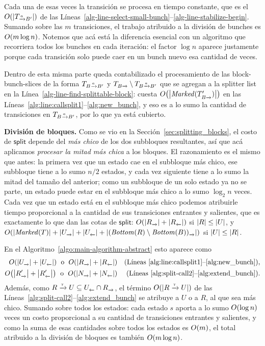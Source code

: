 Cada una de esas veces la transición se procesa en tiempo constante, que es el $\bigo{\size{\TaB}}$ de las Líneas~\ref{alg-line-select-small-bunch}--\ref{alg-line-stabilize-begin}. Sumando sobre las $m$ transiciones, el trabajo atribuido a la división de bunches es ${O\!\left(m \log n\right)}$. Notemos que acá está la diferencia esencial con un algoritmo que recorriera todos los bunches en cada iteración: el factor $\log n$ aparece justamente porque cada transición solo puede caer en un bunch nuevo esa cantidad de veces.

Dentro de esta misma parte queda contabilizado el procesamiento de las block-bunch-slices de la forma $\TBaB$ y $\TB \setminus \TBaB$ que se agregan a la splitter list en la Línea~\ref{alg-line-find-splittable-block}: cuesta $\bigo{\size{\Marked(\TB')}}$ en las Líneas~\ref{alg:line:callsplit1}--\ref{alg:new_bunch}, y eso es a lo sumo la cantidad de transiciones en $\TBaB$, por lo que ya está cubierto.

\textbf{División de bloques.} Como se vio en la Sección~\ref{sec:splitting_blocks}, el costo de $\mathsf{split}$ depende del \emph{más chico} de los dos subbloques resultantes, así que acá aplicamos \emph{procesar la mitad más chica} a los bloques. El razonamiento es el mismo que antes: la primera vez que un estado cae en el subbloque más chico, ese subbloque tiene a lo sumo $n/2$ estados, y cada vez siguiente tiene a lo sumo la mitad del tamaño del anterior; como un subbloque de un solo estado ya no se parte, un estado puede estar en el subbloque más chico a lo sumo $\log_2 n$ veces. Cada vez que un estado está en el subbloque más chico podemos atribuirle tiempo proporcional a la cantidad de sus transiciones entrantes y salientes, que es exactamente lo que dan las cotas de $\mathsf{split}$: $\bigo{\size{R_{\pijl{}}} + \size{R_{\lijp{}}}}$ si $\left\lvert R \right\rvert \leq \left\lvert U \right\rvert$, y $\bigo{\size{\Marked(T)} + \size{U_{\pijl{}}} + \size{U_{\lijp{}}} + \size{(\Bottom(R) \setminus \Bottom(B))_{\pijl{}}}}$ si $\left\lvert U \right\rvert \leq \left\lvert R \right\rvert$.

En el Algoritmo~\ref{algo:main-algorithm-abstract} esto aparece como
\begin{align*}
\bigo{\size{U_{\pijl{}}} + \size{U_{\lijp{}}}} \;\text{ o }\; \bigo{\size{R_{\pijl{}}} + \size{R_{\lijp{}}}}
	&& \text{(Líneas~\ref{alg:line:callsplit1}--\ref{alg:new_bunch})},\\
\bigo{\size{R'_{\pijl{}}} + \size{R'_{\lijp{}}}} \;\text{ o }\; \bigo{\size{N_{\pijl{}}} + \size{N_{\lijp{}}}}
	&& \text{(Líneas~\ref{alg:split-call2}--\ref{alg:extend_bunch})}.
\end{align*}
Además, como $R \pijl{\tau} U \subseteq U_{\lijp{}} \cap R_{\pijl{}}$, el término $\bigo{\size{R \pijl{\tau} U}}$ de las Líneas~\ref{alg:split-call2}--\ref{alg:extend_bunch} se atribuye a $U$ o a $R$, al que sea más chico. Sumando sobre todos los estados: cada estado $s$ aporta a lo sumo ${O\!\left(\log n\right)}$ veces un costo proporcional a su cantidad de transiciones entrantes y salientes, y como la suma de esas cantidades sobre todos los estados es ${O\!\left(m\right)}$, el total atribuido a la división de bloques es también ${O\!\left(m \log n\right)}$.

